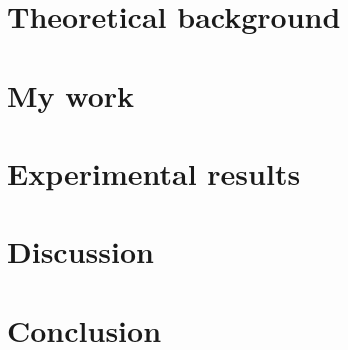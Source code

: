 \documentclass[twoside]{Style/uva-inf-bachelor-thesis}
\begin{document}
\chapter{Theoretical background}\label{chap:theoreticalbackground}


\chapter{My work}\label{chap:mywork}


\chapter{Experimental results}\label{chap:experiments}


\chapter{Discussion}\label{chap:discussion}


\chapter{Conclusion}\label{chap:conclusion}


\printbibliography
\end{document}
